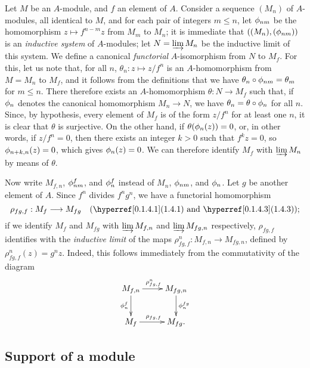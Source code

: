 \begin{env}[1.6.1]
\label{0.1.6.1}
Let $M$ be an $A$-module, and $f$ an element of $A$. Consider a sequence $(M_n)$ of
$A$-modules, all identical to $M$, and for each pair of integers $m\leqslant n$,
let $\phi_{nm}$ be the homomorphism $z\mapsto f^{n-m}z$ from $M_m$ to $M_n$; it
is immediate that $((M_n),(\phi_{nm}))$ is an {\em inductive system} of
$A$-modules; let $N=\varinjlim M_n$ be the inductive limit of this system. We
define a canonical {\em functorial} $A$-isomorphism from $N$ to $M_f$. For this, let us note that, for all $n$, $\theta_n:z\mapsto z/f^n$ is an
$A$-homomorphism from $M=M_n$ to $M_f$, and it follows from the definitions that
we have $\theta_n\circ\phi_{nm}=\theta_m$ for $m\leqslant n$. There therefore
exists an $A$-homomorphism $\theta:N\to M_f$ such that, if $\phi_n$ denotes the
canonical homomorphism $M_n\to N$, we have $\theta_n=\theta\circ\phi_n$ for all
$n$. Since, by hypothesis, every element of $M_f$ is of the form $z/f^n$ for at
least one $n$, it is clear that $\theta$ is surjective. On the other hand, if
$\theta(\phi_n(z))=0$, or, in other words, if $z/f^n=0$, then there exists an integer
$k>0$ such that $f^k z=0$, so $\phi_{n+k,n}(z)=0$, which gives $\phi_n(z)=0$.
We can therefore identify $M_f$ with $\varinjlim M_n$ by means of $\theta$.
\end{env}

\begin{env}[1.6.2]
\label{0.1.6.2}
Now write $M_{f,n}$, $\phi_{nm}^f$, and $\phi_n^f$ instead of $M_n$,
$\phi_{nm}$, and $\phi_n$. Let $g$ be another element of $A$. Since $f^n$ divides
$f^n g^n$, we have a functorial homomorphism
\[
  \rho_{fg,f}:M_f\longrightarrow M_{fg}
  \quad(\sref{0.1.4.1}\text{ and }\sref{0.1.4.3});
\]
if we identify $M_f$ and $M_{fg}$ with $\varinjlim M_{f,n}$ and
$\varinjlim M_{fg,n}$ respectively, $\rho_{fg,f}$ identifies with the
{\em inductive limit} of the maps $\rho_{fg,f}^n:M_{f,n}\to M_{fg,n}$, defined
by $\rho_{fg,f}^n(z)=g^n z$. Indeed, this follows immediately from the
commutativity of the diagram
\[
  \xymatrix{
    M_{f,n}\ar[r]^{\rho_{fg,f}^n}\ar[d]_{\vphi_n^f} &
    M_{fg,n}\ar[d]^{\vphi_n^{fg}}\\
    M_f\ar[r]^{\rho_{fg,f}} &
    M_{fg}.
  }
\]
\end{env}

\subsection{Support of a module}
\label{subsection-support-of-module}


